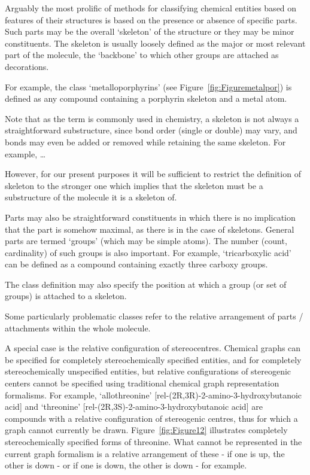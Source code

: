 \documentclass[10pt]{bmc_article}
\newenvironment{bmcformat}{\baselineskip20pt\sloppy\setboolean{publ}{false}}{\baselineskip20pt\sloppy}
\begin{document}
\begin{bmcformat}
Arguably the most prolific of methods for classifying chemical entities based on features of their structures is based on the presence or absence of specific parts.  Such parts may be the overall `skeleton' of the structure or they may be minor constituents. The skeleton is usually loosely defined as the major or most relevant part of the molecule, the `backbone' to which other groups are attached as decorations. 

For example, the class `metalloporphyrins' (see Figure~\ref{fig:Figuremetalpor}) is defined as any compound containing a porphyrin skeleton and a metal atom. 

Note that as the term is commonly used in chemistry, a skeleton is not always a straightforward substructure, since bond order (single or double) may vary, and bonds may even be added or removed while retaining the same skeleton. For example, \ldots

However, for our present purposes it will be sufficient to restrict the definition of skeleton to the stronger one which implies that the skeleton must be a substructure of the molecule it is a skeleton of.





Parts may also be straightforward constituents in which there is no implication that the part is somehow maximal, as there is in the case of skeletons.  General parts are termed `groups' (which may be simple atoms). The number (count, cardinality) of such groups is also important.  For example, `tricarboxylic acid' can be defined as a compound containing exactly three carboxy groups. 


The class definition may also specify the position at which a group (or set of groups) is attached to a skeleton. 

Some particularly problematic classes refer to the relative arrangement of parts / attachments within the whole molecule. 

A special case is the relative configuration of stereocentres. Chemical graphs can be specified for completely stereochemically specified entities, and for completely stereochemically unspecified entities, but relative configurations of stereogenic centers cannot be specified using traditional chemical graph representation formalisms. For example, `allothreonine' [rel-(2R,3R)-2-amino-3-hydroxybutanoic acid] and `threonine' [rel-(2R,3S)-2-amino-3-hydroxybutanoic acid] are compounds with a relative configuration of stereogenic centres, thus for which a graph cannot currently be drawn. Figure~\ref{fig:Figure12} illustrates completely stereochemically specified forms of threonine. What cannot be represented in the current graph formalism is a relative arrangement of these - if one is up, the other is down - or if one is down, the other is down - for example. 


\end{bmcformat}
\end{document}
